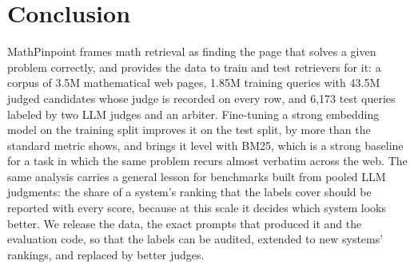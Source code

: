 \section{Conclusion}
\label{sec:conclusion}

MathPinpoint frames math retrieval as finding the page that solves a given problem correctly, and provides the data to train and test retrievers for it: a corpus of 3.5M mathematical web pages, 1.85M training queries with 43.5M judged candidates whose judge is recorded on every row, and 6,173 test queries labeled by two LLM judges and an arbiter. Fine-tuning a strong embedding model on the training split improves it on the test split, by more than the standard metric shows, and brings it level with BM25, which is a strong baseline for a task in which the same problem recurs almost verbatim across the web. The same analysis carries a general lesson for benchmarks built from pooled LLM judgments: the share of a system's ranking that the labels cover should be reported with every score, because at this scale it decides which system looks better. We release the data, the exact prompts that produced it and the evaluation code, so that the labels can be audited, extended to new systems' rankings, and replaced by better judges.
